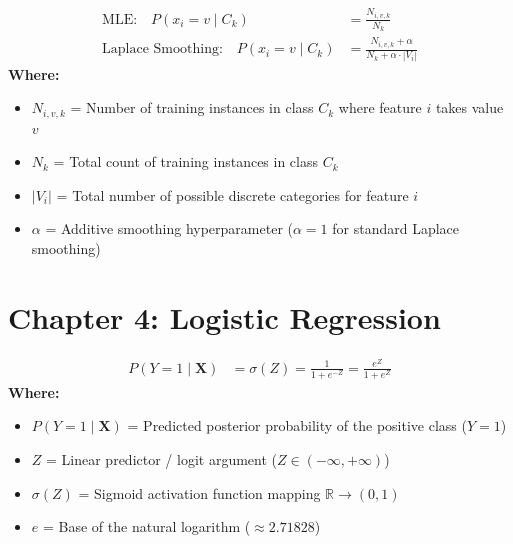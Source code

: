 \begin{formulabox}
\begin{align*}
    \text{MLE:} \quad P(x_i = v \mid C_k) &= \frac{N_{i,v,k}}{N_k} \\[2pt]
    \text{Laplace Smoothing:} \quad P(x_i = v \mid C_k) &= \frac{N_{i,v,k} + \alpha}{N_k + \alpha \cdot |V_i|}
\end{align*}
\textbf{Where:}
\begin{itemize}[noitemsep, topsep=1pt]
    \item $N_{i,v,k}$ = Number of training instances in class $C_k$ where feature $i$ takes value $v$
    \item $N_k$ = Total count of training instances in class $C_k$
    \item $|V_i|$ = Total number of possible discrete categories for feature $i$
    \item $\alpha$ = Additive smoothing hyperparameter ($\alpha = 1$ for standard Laplace smoothing)
\end{itemize}
\end{formulabox}

\section*{Chapter 4: Logistic Regression}

\begin{formulabox}
\begin{align*}
    P(Y = 1 \mid \mathbf{X}) &= \sigma(Z) = \frac{1}{1 + e^{-Z}} = \frac{e^Z}{1 + e^Z}
\end{align*}
\textbf{Where:}
\begin{itemize}[noitemsep, topsep=1pt]
    \item $P(Y = 1 \mid \mathbf{X})$ = Predicted posterior probability of the positive class ($Y=1$)
    \item $Z$ = Linear predictor / logit argument ($Z \in (-\infty, +\infty)$)
    \item $\sigma(Z)$ = Sigmoid activation function mapping $\mathbb{R} \to (0, 1)$
    \item $e$ = Base of the natural logarithm ($\approx 2.71828$)
\end{itemize}
\end{formulabox}

